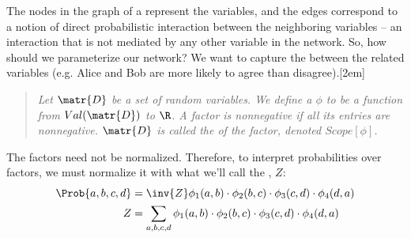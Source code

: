 \documentclass[11pt]{article}
\begin{document}
The nodes in the graph of a  represent the variables, and the edges correspond to a notion of direct probabilistic interaction between the neighboring variables -- an interaction that is not mediated by any other variable in the network. So, how should we parameterize our network? We want to capture the  between the related variables (e.g. Alice and Bob are more likely to agree than disagree).[2em]
\begin{quote}
	{\itshape Let $\matr{D}$ be a set of random variables. We define a  $\phi$ to be a function from $Val(\matr{D})$ to $\R$. A factor is nonnegative if all its entries are nonnegative. $\matr{D}$ is called the  of the factor, denoted $Scope[\phi]$. 
	}
\end{quote}
The factors need not be normalized. Therefore, to interpret probabilities over factors, we must normalize it with what we'll call the , $Z$:
\begin{align}
	\Prob{a, b, c, d} &= \inv{Z} \phi_1(a, b) \cdot \phi_2(b, c) \cdot \phi_3(c, d) \cdot \phi_4(d, a) \\
	Z &= \sum_{a, b, c, d} \phi_1(a, b) \cdot \phi_2(b, c) \cdot \phi_3(c, d) \cdot \phi_4(d, a)  
\end{align}
\end{document}
